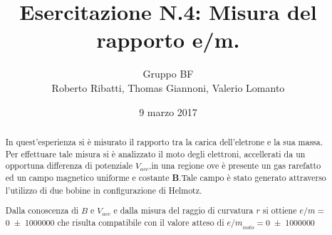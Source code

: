 \documentclass[a4paper,11pt]{article}
\author{Gruppo BF \\ Roberto Ribatti, Thomas Giannoni, Valerio Lomanto}
\title{Esercitazione N.4: Misura del rapporto e/m.}
\date{9 marzo 2017}
\begin{document}
\maketitle
\begin{abstract}
	In quest'esperienza si è misurato il rapporto tra la carica dell'eletrone
	e la sua massa.
	Per effettuare tale misura si è analizzato il moto degli elettroni,
	accellerati da un opportuna differenza di potenziale $V_{acc}$,in una regione ove è
	presente un gas rarefatto ed un campo magnetico uniforme e costante \textbf{B}.Tale campo è stato generato  attraverso l'utilizzo di
	due bobine in configurazione di Helmotz.
	
	Dalla conoscenza di $B$ e $V_{acc}$ e dalla misura del raggio di curvatura $r$ si ottiene $e/m=$ \SI{0\pm 1000000}{\frac{\coulomb}{\kilogram}}  che risulta compatibile con il valore atteso di ${e/m}_{noto}=$\SI{0\pm 1000000}{\frac{\coulomb}{\kilogram}}
	
	
\end{abstract}


\end{document}
